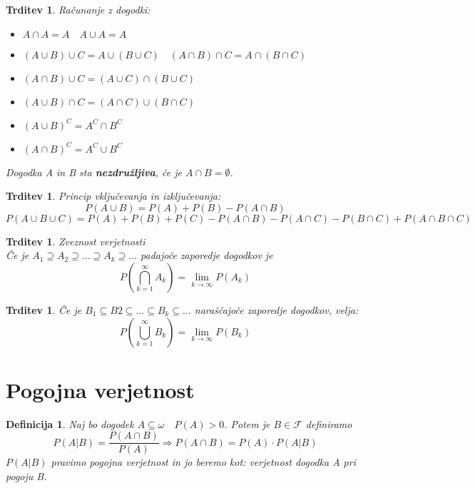 \documentclass[11pt]{article}
\newtheorem{Trditev}[Izrek]{{\sc Trditev}}
\newtheorem{Definicija}[Izrek]{{\sc Definicija}}
\begin{document}
\begin{Trditev}
	Računanje z dogodki:
	\begin{itemize}
		\item
		$A\cap A = A \quad A\cup A = A$
		\item
		$(A\cup B)\cup C = A\cup (B \cup C) \quad (A\cap B) \cap C = A \cap (B\cap C)$
		\item
		$(A\cap B)\cup C = (A \cup C ) \cap (B\cup C)$ 
		\item
		$(A\cup B)\cap C = (A \cap C ) \cup (B\cap C)$ 
		\item
		$(A \cup B)^C = A^C \cap B^C$
		\item
		$(A\cap B) ^C = A^C \cup B^C$
	\end{itemize}
	
	Dogodka A in B sta \textbf{nezdružljiva}, če je $A \cap B = \emptyset$.
\end{Trditev}


\begin{Trditev}
	Princip vključevanja in izključevanja:
	$$P(A\cup B  ) = P(A) + P(B) - P(A \cap B)$$
	$$P(A \cup B \cup C) = P(A) + P(B) + P(C) - P(A \cap B) - P(A \cap C ) - P(B \cap C) + P(A\cap B \cap C)$$
\end{Trditev}

\begin{Trditev}
	Zveznost verjetnosti
	\\
	Če je $A_1 \supseteq A_2 \supseteq \dots \supseteq A_k \supseteq \dots $ padajoče zaporedje dogodkov je 
	\[
	P(\bigcap_{k=1}^{\infty} A_k) = \lim\limits_{k \to \infty}{P(A_k)}
	\]
\end{Trditev}
\begin{Trditev}
	Če je $ B_1 \subseteq B2 \subseteq ... \subseteq B_k \subseteq \dots$ naraščajoče zaporedje dogodkov, velja:
	\[
	P(\bigcup_{k=1}^{\infty} B_k) = \lim\limits_{k \to \infty}{P(B_k)}
	\]
\end{Trditev}
\section{Pogojna verjetnost}
\begin{Definicija}
	Naj bo dogodek $A \subseteq \omega \quad P(A) > 0$.
	Potem je $B\in \mathcal{F}$ definiramo $$P(A|B) = \frac{P(A \cap B)}{P(A)} \Rightarrow P(A\cap B) = P(A) \cdot P(A|B)$$
	$P(A|B)$ pravimo pogojna verjetnost in jo beremo kot: verjetnost dogodka A pri pogoju B.
\end{Definicija}
\end{document}
